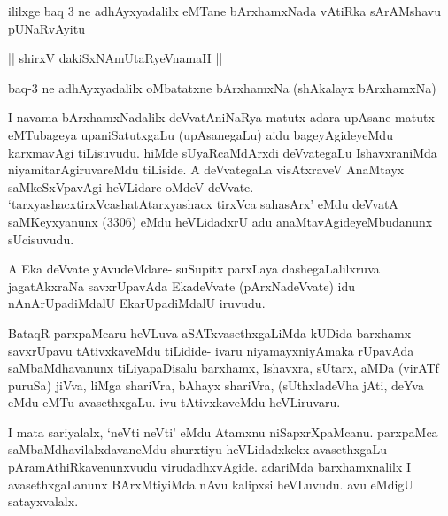 \begin{center}
ililxge baq 3 ne adhAyxyadalilx eMTane bArxhamxNada vAtiRka sArAMshavu pUNaRvAyitu
\end{center}

\begin{center}
|| shirxV dakiSxNAmUtaRyeVnamaH ||
\end{center}

\begin{center}
baq-3 ne adhAyxyadalilx oMbatatxne bArxhamxNa (shAkalayx bArxhamxNa)
\end{center}

\begin{artha}
I navama bArxhamxNadalilx deVvatAniNaRya matutx adara upAsane matutx eMTubageya upaniSatutxgaLu (upAsanegaLu) aidu bageyAgideyeMdu karxmavAgi tiLisuvudu. hiMde sUyaRcaMdArxdi deVvategaLu IshavxraniMda niyamitarAgiruvareMdu tiLiside. A deVvategaLa visAtxraveV AnaMtayx saMkeSxVpavAgi heVLidare oMdeV deVvate. `tarxyashacxtirxVcashatAtarxyashacx tirxVca sahasArx' eMdu deVvatA saMKeyxyanunx (3306) eMdu heVLidadxrU adu anaMtavAgideyeMbudanunx sUcisuvudu. 
\end{artha}

\begin{artha}
A Eka deVvate yAvudeMdare- suSupitx parxLaya dashegaLalilxruva jagatAkxraNa savxrUpavAda EkadeVvate (pArxNadeVvate) idu nAnArUpadiMdalU EkarUpadiMdalU iruvudu. 
\end{artha}


\begin{artha}
BataqR parxpaMcaru heVLuva aSATxvasethxgaLiMda kUDida barxhamx savxrUpavu tAtivxkaveMdu tiLidide- ivaru niyamayxniyAmaka rUpavAda saMbaMdhavanunx tiLiyapaDisalu barxhamx, Ishavxra, sUtarx, aMDa (virATf puruSa) jiVva, liMga shariVra, bAhayx shariVra, (sUthxladeVha jAti, deYva eMdu eMTu avasethxgaLu. ivu tAtivxkaveMdu heVLiruvaru.
\end{artha}


\begin{artha}
I mata sariyalalx, `neVti neVti' eMdu Atamxnu niSapxrXpaMcanu. parxpaMca saMbaMdhavilalxdavaneMdu shurxtiyu heVLidadxkekx avasethxgaLu pAramAthiRkavenunxvudu virudadhxvAgide. adariMda barxhamxnalilx I avasethxgaLanunx BArxMtiyiMda nAvu kalipxsi heVLuvudu. avu eMdigU satayxvalalx. 
\end{artha}

